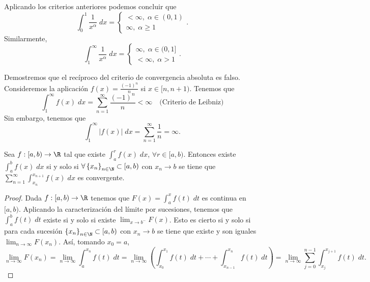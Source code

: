 \begin{observation}
\normalfont Aplicando los criterios anteriores podemos concluir que
\[\int^{1}_{0} \frac{1}{x^{\alpha }} \; dx = 
\begin{cases}
< \infty, \; \alpha \in \left(0,1\right) \\
\infty, \; \alpha \geq 1
\end{cases}
.\]
Similarmente, 
\[\int^{\infty}_{1} \frac{1}{x^{\alpha }} \; dx =
\begin{cases}
	\infty, \; \alpha \in (0,1] \\
	< \infty, \; \alpha > 1
\end{cases}
.\]
\end{observation}
\begin{eg}
\normalfont Demostremos que el recíproco del criterio de convergencia absoluta es falso. Consideremos la aplicación $\displaystyle f\left(x\right) = \frac{\left(-1\right)^{n}}{n} $ si $\displaystyle x \in [n,n+1) $. Tenemos que 
\[\int^{\infty}_{1} f\left(x\right) \; dx = \sum^{\infty}_{n = 1}\frac{\left(-1\right)^{n}}{n} < \infty \quad \text{(Criterio de Leibniz)} \]
Sin embargo, tenemos que 
\[\int^{\infty}_{1} \left|f\left(x\right)\right| \; dx = \sum^{\infty}_{n =1 }\frac{1}{n} = \infty .\]
\end{eg}
\begin{ftheorem}
	\normalfont Sea $\displaystyle f : [a,b) \to \R $ tal que existe $\displaystyle \int^{r}_{a} f\left(x\right) \; dx $, $\displaystyle \forall r \in [a,b) $. Entonces existe $\displaystyle \int^{b}_{a} f\left(x\right) \; dx  $ si y solo si $\displaystyle \forall \left\{ x_{n}\right\} _{n\in\N}\subset[a,b) $ con $\displaystyle x_{n} \to b $ se tiene que $\displaystyle \sum^{\infty}_{n=1}\int^{x_{n+1}}_{x_{n}} f\left(x\right) \; dx $ es convergente.
\end{ftheorem}
\begin{proof}
Dada $\displaystyle f : [a,b) \to \R $ tenemos que $\displaystyle F\left(x\right) = \int^{x}_{a} f\left(t\right) \; dt $ es continua en $\displaystyle [a,b) $. Aplicando la caracterización del límite por sucesiones, tenemos que $\displaystyle \int^{b}_{a} f\left(t\right) \; dt $ existe si y solo si existe $\displaystyle \lim_{x \to b^{-}}F\left(x\right) $.
Esto es cierto si y solo si para cada sucesión $\displaystyle \left\{ x_{n}\right\}_{n\in\N} \subset[a,b)  $ con $\displaystyle x_{n} \to b $ se tiene que existe y son iguales $\displaystyle \lim_{n \to \infty}F\left(x_{n}\right) $. Así, tomando $\displaystyle x_{0} = a $,
\[\lim_{n \to \infty}F\left(x_{n}\right) =  \lim_{n \to \infty}\int^{x_{n}}_{a} f\left(t\right) \; dt =  \lim_{n \to \infty}\left(\int^{x_{1}}_{x_{0}} f\left(t\right) \; dt + \cdots + \int^{x_{n}}_{x_{n-1}} f\left(t\right) \; dt\right) =\lim_{n \to \infty}\sum^{n-1}_{j=0}\int^{x_{j+1}}_{x_{j}} f\left(t\right) \; dt.\]
\end{proof}
